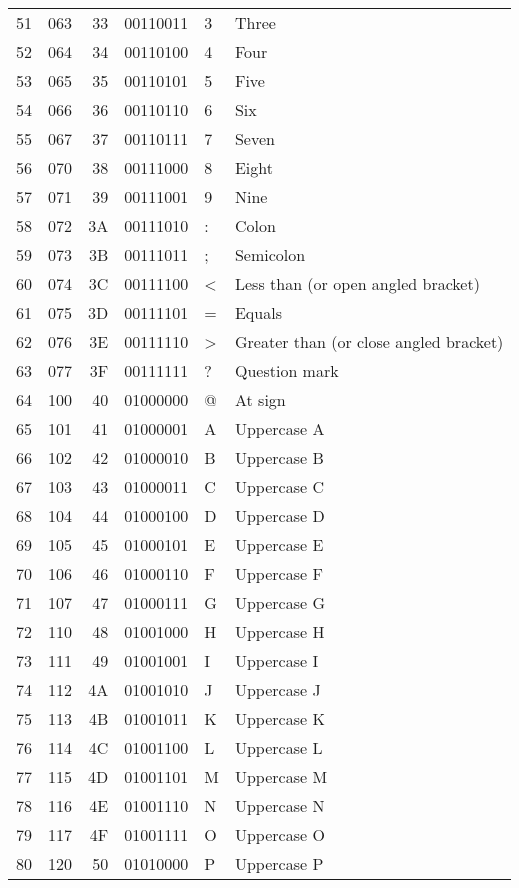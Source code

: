 \documentclass[11pt]{article}
\begin{document}
\begin{longtable}{rrrrll}
51 & 063 & 33 & 00110011 & 3 & Three\\[0pt]
52 & 064 & 34 & 00110100 & 4 & Four\\[0pt]
53 & 065 & 35 & 00110101 & 5 & Five\\[0pt]
54 & 066 & 36 & 00110110 & 6 & Six\\[0pt]
55 & 067 & 37 & 00110111 & 7 & Seven\\[0pt]
56 & 070 & 38 & 00111000 & 8 & Eight\\[0pt]
57 & 071 & 39 & 00111001 & 9 & Nine\\[0pt]
58 & 072 & 3A & 00111010 & : & Colon\\[0pt]
59 & 073 & 3B & 00111011 & ; & Semicolon\\[0pt]
60 & 074 & 3C & 00111100 & < & Less than (or open angled bracket)\\[0pt]
61 & 075 & 3D & 00111101 & = & Equals\\[0pt]
62 & 076 & 3E & 00111110 & > & Greater than (or close angled bracket)\\[0pt]
63 & 077 & 3F & 00111111 & ? & Question mark\\[0pt]
64 & 100 & 40 & 01000000 & @ & At sign\\[0pt]
65 & 101 & 41 & 01000001 & A & Uppercase A\\[0pt]
66 & 102 & 42 & 01000010 & B & Uppercase B\\[0pt]
67 & 103 & 43 & 01000011 & C & Uppercase C\\[0pt]
68 & 104 & 44 & 01000100 & D & Uppercase D\\[0pt]
69 & 105 & 45 & 01000101 & E & Uppercase E\\[0pt]
70 & 106 & 46 & 01000110 & F & Uppercase F\\[0pt]
71 & 107 & 47 & 01000111 & G & Uppercase G\\[0pt]
72 & 110 & 48 & 01001000 & H & Uppercase H\\[0pt]
73 & 111 & 49 & 01001001 & I & Uppercase I\\[0pt]
74 & 112 & 4A & 01001010 & J & Uppercase J\\[0pt]
75 & 113 & 4B & 01001011 & K & Uppercase K\\[0pt]
76 & 114 & 4C & 01001100 & L & Uppercase L\\[0pt]
77 & 115 & 4D & 01001101 & M & Uppercase M\\[0pt]
78 & 116 & 4E & 01001110 & N & Uppercase N\\[0pt]
79 & 117 & 4F & 01001111 & O & Uppercase O\\[0pt]
80 & 120 & 50 & 01010000 & P & Uppercase P\\[0pt]

\end{longtable}
\end{document}

